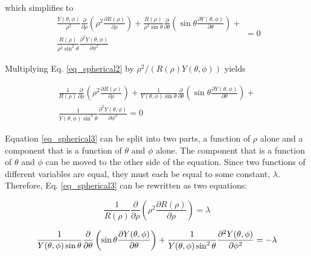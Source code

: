 \documentclass{article}
\numberwithin{equation}{subsection}
\begin{document}
\noindent
which simplifies to
\begin{equation} \label{eq_spherical2}
\begin{split}
\frac{Y(\theta, \phi)}{\rho^2}
\frac{\partial}{\partial \rho} 
\left( \rho^2 \frac{\partial R(\rho)}{\partial \rho}\right) 
+ 
\frac{R(\rho)}{\rho^2 \sin \theta}
\frac{\partial}{\partial \theta}
\left( \sin \theta \frac{\partial Y(\theta, \phi)}{\partial \theta}\right) 
+ \\
\frac{R(\rho)}{\rho^2 \sin^2 \theta} 
\frac{\partial^2 Y(\theta, \phi)}{\partial \phi^2}
\end{split} = 0
\end{equation}

\noindent
Multiplying Eq. \ref{eq_spherical2} by $\rho^2 / (R(\rho)Y(\theta, \phi))$ yields

\begin{equation}\label{eq_spherical3}
\begin{split}
\frac{1}{R(\rho)}
\frac{\partial}{\partial \rho} 
\left( \rho^2 \frac{\partial R(\rho)}{\partial \rho}\right) 
+ 
\frac{1}{Y(\theta, \phi) \sin \theta}
\frac{\partial}{\partial \theta}
\left( \sin \theta \frac{\partial Y(\theta, \phi)}{\partial \theta}\right) 
+ \\
\frac{1}{Y(\theta, \phi) \sin^2 \theta} 
\frac{\partial^2 Y(\theta, \phi)}{\partial \phi^2} = 0
\end{split}
\end{equation}

Equation \ref{eq_spherical3} can be split into two parts, a function of $\rho$ alone and a component that is a function of $\theta$ and $\phi$ alone. The component that is a function of $\theta$ and $\phi$ can be moved to the other side of the equation. Since two functions of different variables are equal, they must each be equal to some constant, $\lambda$. Therefore, Eq. \ref{eq_spherical3} can be rewritten as two equations:

\begin{equation}\label{eq_spherical_r}
\frac{1}{R(\rho)}
\frac{\partial}{\partial \rho} 
\left( \rho^2 \frac{\partial R(\rho)}{\partial \rho}\right) = \lambda
\end{equation}

\begin{equation}\label{eq_spherical_tp}
\frac{1}{Y(\theta, \phi) \sin \theta}
\frac{\partial}{\partial \theta}
\left( \sin \theta \frac{\partial Y(\theta, \phi)}{\partial \theta}\right) 
+ \\
\frac{1}{Y(\theta, \phi) \sin^2 \theta} 
\frac{\partial^2 Y(\theta, \phi)}{\partial \phi^2} = -\lambda
\end{equation}
\end{document}
